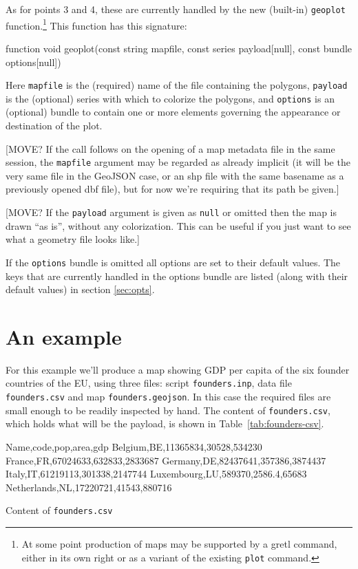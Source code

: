 \documentclass{article}
\begin{document}
As for points 3 and 4, these are currently handled by the new
(built-in) \texttt{geoplot} function.\footnote{At some point
  production of maps may be supported by a gretl command, either in
  its own right or as a variant of the existing \texttt{plot}
  command.} This function has this signature:
\begin{code}
function void geoplot(const string mapfile,
	              const series payload[null],
	              const bundle options[null])
\end{code}
Here \texttt{mapfile} is the (required) name of the file containing
the polygons, \texttt{payload} is the (optional) series with which to
colorize the polygons, and \texttt{options} is an (optional) bundle to
contain one or more elements governing the appearance or destination
of the plot.

[MOVE? If the  call follows on the opening of a map metadata
file in the same session, the \texttt{mapfile} argument may be
regarded as already implicit (it will be the very same file in the
GeoJSON case, or an shp file with the same basename as a previously
opened dbf file), but for now we're requiring that its path be given.]

[MOVE? If the \texttt{payload} argument is given as \texttt{null} or omitted
then the map is drawn ``as is'', without any colorization. This can be
useful if you just want to see what a geometry file looks like.]

If the \texttt{options} bundle is omitted all options are set to their
default values. The keys that are currently handled in the options
bundle are listed (along with their default values) in section
\ref{sec:opts}.

\section{An example}
\label{sec:example}

For this example we'll produce a map showing GDP per capita of the six
founder countries of the EU, using three files: script
\texttt{founders.inp}, data file \texttt{founders.csv} and map
\texttt{founders.geojson}. In this case the required files are small
enough to be readily inspected by hand.  The content of
\texttt{founders.csv}, which holds what will be the payload, is shown
in Table~\ref{tab:founders-csv}.

\begin{table}[p]
 \hrulefill
\begin{code}
Name,code,pop,area,gdp
Belgium,BE,11365834,30528,534230
France,FR,67024633,632833,2833687
Germany,DE,82437641,357386,3874437
Italy,IT,61219113,301338,2147744
Luxembourg,LU,589370,2586.4,65683
Netherlands,NL,17220721,41543,880716
\end{code}
\hrulefill
\caption{Content of \texttt{founders.csv}}
\label{tab:founders-csv}
\end{table}
\end{document}
